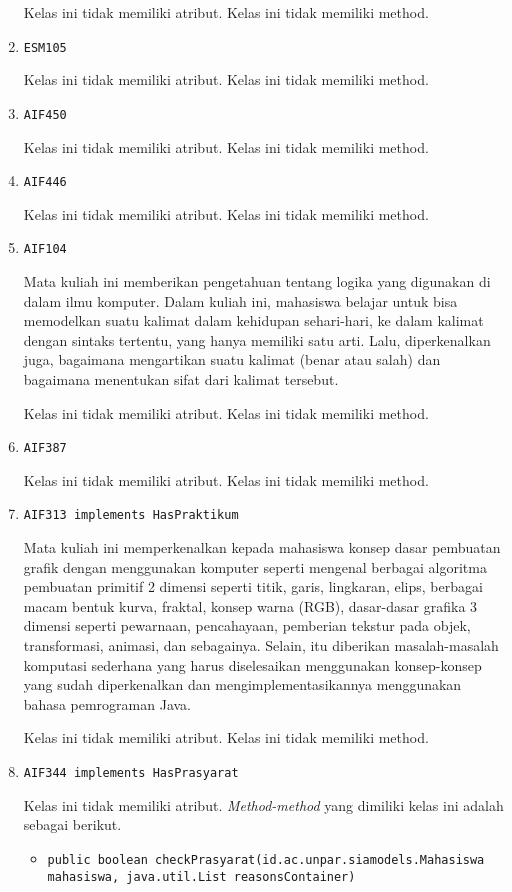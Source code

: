 \documentclass{article}
\begin{document}
\begin{enumerate}
Kelas ini tidak memiliki atribut. Kelas ini tidak memiliki method. \item \texttt{ESM105}



Kelas ini tidak memiliki atribut. Kelas ini tidak memiliki method. \item \texttt{AIF450}



Kelas ini tidak memiliki atribut. Kelas ini tidak memiliki method. \item \texttt{AIF446}



Kelas ini tidak memiliki atribut. Kelas ini tidak memiliki method. \item \texttt{AIF104}

Mata kuliah ini memberikan pengetahuan tentang logika yang digunakan di 
 dalam ilmu komputer. Dalam kuliah ini, mahasiswa belajar untuk bisa 
 memodelkan suatu kalimat dalam kehidupan sehari-hari, ke dalam kalimat 
 dengan sintaks tertentu, yang hanya memiliki satu arti. Lalu, diperkenalkan 
 juga, bagaimana mengartikan suatu kalimat (benar atau salah) dan bagaimana 
 menentukan sifat dari kalimat tersebut.

Kelas ini tidak memiliki atribut. Kelas ini tidak memiliki method. \item \texttt{AIF387}



Kelas ini tidak memiliki atribut. Kelas ini tidak memiliki method. \item \texttt{AIF313 implements HasPraktikum}

Mata kuliah ini memperkenalkan kepada mahasiswa konsep dasar pembuatan grafik
 dengan menggunakan komputer seperti mengenal berbagai algoritma pembuatan
 primitif 2 dimensi seperti titik, garis, lingkaran, elips, berbagai macam
 bentuk kurva, fraktal, konsep warna (RGB), dasar-dasar grafika 3 dimensi
 seperti pewarnaan, pencahayaan, pemberian tekstur pada objek, transformasi,
 animasi, dan sebagainya. Selain, itu diberikan masalah-masalah komputasi
 sederhana yang harus diselesaikan menggunakan konsep-konsep yang sudah
 diperkenalkan dan mengimplementasikannya menggunakan bahasa pemrograman Java.

Kelas ini tidak memiliki atribut. Kelas ini tidak memiliki method. \item \texttt{AIF344 implements HasPrasyarat}



Kelas ini tidak memiliki atribut. \textit{Method-method} yang dimiliki kelas ini adalah sebagai berikut.
\begin{itemize}
\item \texttt{public boolean checkPrasyarat(id.ac.unpar.siamodels.Mahasiswa mahasiswa, java.util.List reasonsContainer)}




\end{itemize}
\end{enumerate}
\end{document}
